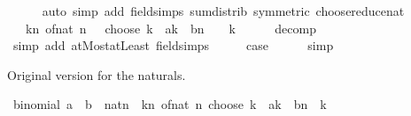 \begin{isabellebody}
\ \ \ \ \isamarkupfalse%
\ {\isacharparenleft}{\kern0pt}auto\ simp\ add{\isacharcolon}{\kern0pt}\ field{\isacharunderscore}{\kern0pt}simps\ sum{\isachardot}{\kern0pt}distrib\ {\isacharbrackleft}{\kern0pt}symmetric{\isacharbrackright}{\kern0pt}\ choose{\isacharunderscore}{\kern0pt}reduce{\isacharunderscore}{\kern0pt}nat{\isacharparenright}{\kern0pt}\isanewline
\ \ \isamarkupfalse%
\ \isamarkupfalse%
\ {\isachardoublequoteopen}{\isasymdots}\ {\isacharequal}{\kern0pt}\ {\isacharparenleft}{\kern0pt}{\isasymSum}k{\isasymle}n{\isacharplus}{\kern0pt}{}{\isachardot}{\kern0pt}\ of{\isacharunderscore}{\kern0pt}nat\ {\isacharparenleft}{\kern0pt}n\ {\isacharplus}{\kern0pt}\ {}\ choose\ k{\isacharparenright}{\kern0pt}\ {\isacharasterisk}{\kern0pt}\ a{\isacharcircum}{\kern0pt}k\ {\isacharasterisk}{\kern0pt}\ b{\isacharcircum}{\kern0pt}{\isacharparenleft}{\kern0pt}n\ {\isacharplus}{\kern0pt}\ {}\ {\isacharminus}{\kern0pt}\ k{\isacharparenright}{\kern0pt}{\isacharparenright}{\kern0pt}{\isachardoublequoteclose}\isanewline
\ \ \ \ \isamarkupfalse%
\ decomp\ \isamarkupfalse%
\ {\isacharparenleft}{\kern0pt}simp\ add{\isacharcolon}{\kern0pt}\ atMost{\isacharunderscore}{\kern0pt}atLeast{}\ field{\isacharunderscore}{\kern0pt}simps{\isacharparenright}{\kern0pt}\isanewline
\ \ \isamarkupfalse%
\ \isamarkupfalse%
\ {\isacharquery}{\kern0pt}case\isanewline
\ \ \ \ \isamarkupfalse%
\ simp\isanewline
{}\isamarkupfalse%
%
\endisatagproof
{\isafoldproof}%
%
\isadelimproof
%
\endisadelimproof
%
\begin{isamarkuptext}%
Original version for the naturals.%
\end{isamarkuptext}\isamarkuptrue%
\isamarkupfalse%
\ binomial{\isacharcolon}{\kern0pt}\ {\isachardoublequoteopen}{\isacharparenleft}{\kern0pt}a\ {\isacharplus}{\kern0pt}\ b\ {\isacharcolon}{\kern0pt}{\isacharcolon}{\kern0pt}\ nat{\isacharparenright}{\kern0pt}{\isacharcircum}{\kern0pt}n\ {\isacharequal}{\kern0pt}\ {\isacharparenleft}{\kern0pt}{\isasymSum}k{\isasymle}n{\isachardot}{\kern0pt}\ {\isacharparenleft}{\kern0pt}of{\isacharunderscore}{\kern0pt}nat\ {\isacharparenleft}{\kern0pt}n\ choose\ k{\isacharparenright}{\kern0pt}{\isacharparenright}{\kern0pt}\ {\isacharasterisk}{\kern0pt}\ a{\isacharcircum}{\kern0pt}k\ {\isacharasterisk}{\kern0pt}\ b{\isacharcircum}{\kern0pt}{\isacharparenleft}{\kern0pt}n\ {\isacharminus}{\kern0pt}\ k{\isacharparenright}{\kern0pt}{\isacharparenright}{\kern0pt}{\isachardoublequoteclose}\isanewline

\end{isabellebody}

